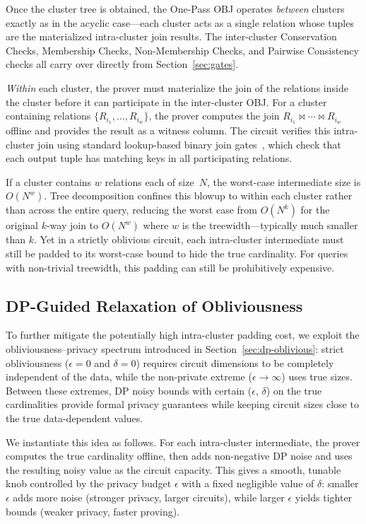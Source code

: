 \documentclass[sigconf]{acmart}
\renewcommand{\emph}[1]{\textit{#1}}
\begin{document}
Once the cluster tree is obtained, the One-Pass OBJ operates \emph{between} clusters exactly as in the acyclic case---each cluster acts as a single relation whose tuples are the materialized intra-cluster join results. The inter-cluster Conservation Checks, Membership Checks, Non-Membership Checks, and Pairwise Consistency checks all carry over directly from Section~\ref{sec:gates}.

\emph{Within} each cluster, the prover must materialize the join of the relations inside the cluster before it can participate in the inter-cluster OBJ. For a cluster containing relations $\{R_{i_1}, \dots, R_{i_w}\}$, the prover computes the join $R_{i_1} \bowtie \cdots \bowtie R_{i_w}$ offline and provides the result as a witness column. The circuit verifies this intra-cluster join using standard lookup-based binary join gates~\cite{gu2025poneglyphdb}, which check that each output tuple has matching keys in all participating relations.

If a cluster contains $w$ relations each of size~$N$, the worst-case intermediate size is $O(N^w)$. Tree decomposition confines this blowup to within each cluster rather than across the entire query, reducing the worst case from $O(N^k)$ for the original $k$-way join to $O(N^w)$ where $w$ is the treewidth---typically much smaller than $k$. Yet in a strictly oblivious circuit, each intra-cluster intermediate must still be padded to its worst-case bound to hide the true cardinality. For queries with non-trivial treewidth, this padding can still be prohibitively expensive.

\subsection{DP-Guided Relaxation of Obliviousness}
\label{sec:relax-cyclic}

To further mitigate the potentially high intra-cluster padding cost, we exploit the obliviousness--privacy spectrum introduced in Section~\ref{sec:dp-oblivious}: strict obliviousness ($\epsilon = 0 $ and $\delta = 0$) requires circuit dimensions to be completely independent of the data, while the non-private extreme ($\epsilon \to \infty$) uses true sizes. Between these extremes, DP noisy bounds with certain ($\epsilon$, $\delta$)  on the true cardinalities provide formal privacy guarantees while keeping circuit sizes close to the true data-dependent values.

We instantiate this idea as follows. For each intra-cluster intermediate, the prover computes the true cardinality offline, then adds non-negative DP noise and uses the resulting noisy value as the circuit capacity. This gives a smooth, tunable knob controlled by the privacy budget $\epsilon$ with a fixed negligible value of $\delta$: smaller $\epsilon$ adds more noise (stronger privacy, larger circuits), while larger $\epsilon$ yields tighter bounds (weaker privacy, faster proving).
\end{document}
